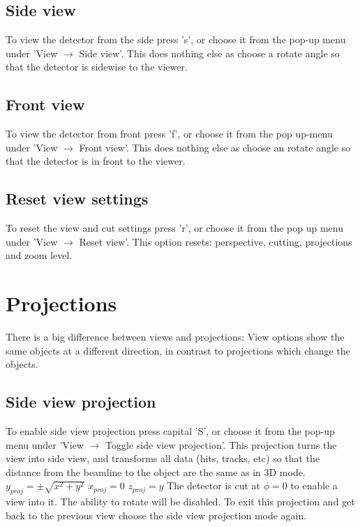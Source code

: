 \documentclass[a4paper,10pt]{article}
\begin{document}
\subsection{Side view}
To view the detector from the side press 's', or choose it from the pop-up menu under 'View $\rightarrow$ Side view'. This does nothing else as choose a rotate angle so that the detector is sidewise to the viewer.

\subsection{Front view}
To view the detector from front press 'f', or choose it from the pop up-menu under 'View $\rightarrow$ Front view'. This does nothing else as choose an rotate angle so that the detector is in front to the viewer.

\subsection{Reset view settings}
To reset the view and cut settings press 'r', or choose it from the pop up menu under 'View $\rightarrow$ Reset view'. This option resets: perspective, cutting, projections and zoom level.

\section{Projections}
There is a big difference between views and projections: View options show the same objects at a different direction, in contrast to projections which change the objects. 

\subsection{Side view projection}
To enable side view projection press capital 'S', or choose it from the pop-up menu under 'View $\rightarrow$ Toggle side view projection'. This projection turns the view into side view, and transforms all data (hits, tracks, etc) so that the distance from the beamline to the object are the same as in 3D mode.
\newline\newline
$y_{proj} = \pm \sqrt{x^2 + y^2}$\newline
$x_{proj}=0$\newline
$z_{proj} = y$ \newline
\newline
The detector is cut at $\phi=0$ to enable a view into it. The ability to rotate will be disabled. To exit this projection and get back to the previous view choose the side view projection mode again. 
\end{document}
